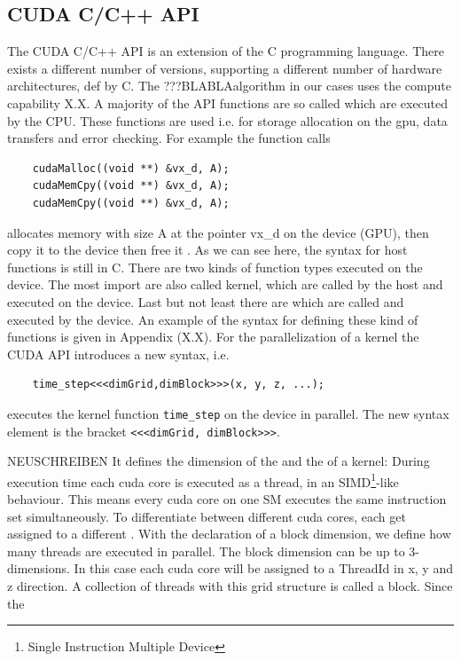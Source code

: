\subsection{CUDA C/C++ API}

The CUDA C/C++ API is an extension of the C programming language.
There exists a different number of versions, supporting a different number of hardware architectures, def by C.
The ???BLABLAalgorithm in our cases uses the compute capability X.X.
A majority of the API functions are so called   which are executed by the CPU.
These functions are used i.e. for storage allocation on the gpu, data transfers and error checking.
For example the function calls
\begin{verbatim}
    cudaMalloc((void **) &vx_d, A);
    cudaMemCpy((void **) &vx_d, A);
    cudaMemCpy((void **) &vx_d, A);
\end{verbatim}
allocates memory with size A at the pointer vx\_d on the device (GPU), then copy it to the device then free it . As we can see here, the syntax for host functions is still in C.
There are two kinds of function types executed on the device.
The most import are  also called kernel, which are called by the host and executed on the device.
Last but not least there are  which are called and executed by the device.
An example of the syntax for defining these kind of functions is given in Appendix (X.X).
For the parallelization of a kernel the CUDA API introduces a new syntax, i.e.

\begin{verbatim}
    time_step<<<dimGrid,dimBlock>>>(x, y, z, ...);
\end{verbatim}

executes the kernel function \texttt{time\_step} on the device in parallel.
The new syntax element is the bracket \texttt{<<<dimGrid, dimBlock>>>}.

NEUSCHREIBEN
It defines the dimension of the  and the  of a kernel:
During execution time each cuda core is executed as a thread, in an SIMD\footnote{Single Instruction Multiple Device}-like behaviour.
This means every cuda core on one SM executes the same instruction set simultaneously. To differentiate between different cuda cores,
each get assigned to a different .
With the declaration of a block dimension, we define how many threads are executed in parallel.
The block dimension can be up to 3-dimensions. In this case each cuda core will be assigned to a ThreadId in x, y and z direction.
A collection of threads with this grid structure is called a block.
Since the

